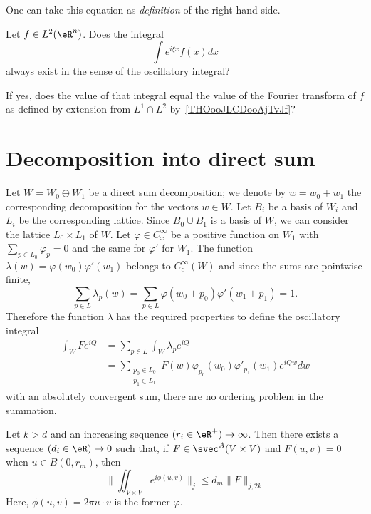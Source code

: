 One can take this equation as \emph{definition} of the right hand side.

\begin{probleme}
	Let \( f\in L^2(\eR^n)\). Does the integral
	\begin{equation}
		\int  e^{i\xi x}f(x)dx
	\end{equation}
	always exist in the sense of the oscillatory integral?

	If yes, does the value of that integral equal the value of the Fourier transform of \( f\) as defined by extension from \( L^1\cap L^2\) by~\ref{THOooJLCDooAjTvJf}?
\end{probleme}

\section{Decomposition into direct sum}

Let $W=W_0\oplus W_1$ be a direct sum decomposition; we denote by $w=w_0+w_1$ the corresponding decomposition for the vectors $w\in W$. Let $B_i$ be a basis of $W_i$ and $L_i$ be the corresponding lattice. Since $B_0\cup B_1$ is a basis of $W$, we can consider the lattice $L_0\times L_1$ of $W$. Let $\varphi\in C^{\infty}_x$ be a positive function on $W_1$ with $\sum_{p\in L_0}\varphi_p=0$ and the same for $\varphi'$ for $W_1$. The function $\lambda(w)=\varphi(w_0)\varphi'(w_1)$ belongs to $C^{\infty}_c(W)$ and since the sums are pointwise finite,
\[
	\sum_{p\in L}\lambda_p(w)=\sum_{p\in L}\varphi(w_0+p_0)\varphi'(w_1+p_1)=1.
\]
Therefore the function $\lambda$ has the required properties to define the oscillatory integral
\begin{equation}  \label{eq:osc_int_phip}
	\begin{split}
		\int_WFe^{iQ}&=\sum_{p\in L}\int_W\lambda_pe^{iQ}\\
		&=\sum_{\substack{p_0\in L_0\\p_1\in L_1}}F(w)\varphi_{p_0}(w_0)\varphi'_{p_1}(w_1)e^{iQw}dw
	\end{split}
\end{equation}
with an absolutely convergent sum, there are no ordering problem in the summation.

\begin{proposition}
	Let $k>d$ and an increasing sequence $(r_i\in\eR^+)\to\infty$. Then there exists a sequence $(d_i\in\eR)\to 0$ such that, if $F\in\svec^A(V\times V)$ and $F(u,v)=0$ when $u\in B(0,r_m)$,  then
	\[
		\| \iint_{V\times V}e^{i\phi(u,v)} \|_j\leq d_m\| F \|_{j,2k}
	\]
	Here, $\phi(u,v)=2\pi u\cdot v$ is the former $\varphi$.
\end{proposition}

